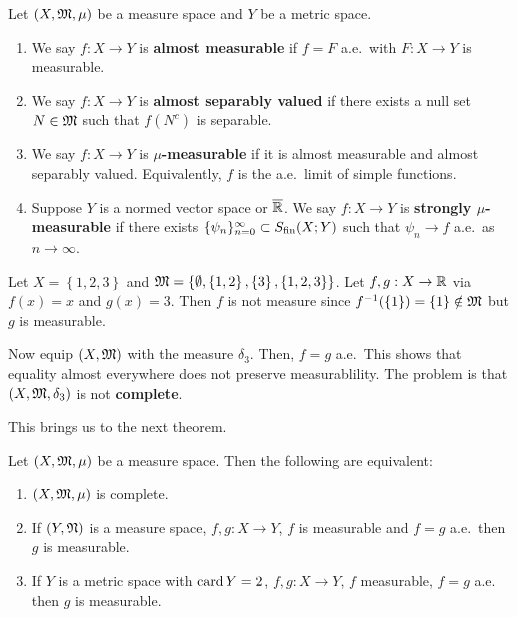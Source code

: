 \documentclass[a4paper]{article}
\renewcommand{\seqinfn}[1]{\{ #1 \}_{n=0}^\infty}
\begin{document}
\begin{defi}
  Let $(X, \mathfrak{M}, \mu)$ be a measure space and $Y$ be a metric space.
  \begin{enumerate}
    \item We say $f : X \to Y$ is \textbf{almost measurable} if $f = F$
          a.e.\ with $F: X \to Y$ is measurable.

    \item We say $f : X \to Y$ is \textbf{almost separably valued} if
          there exists a null set $N \in \mathfrak{M}$ such that $f(N^c)$ is
          separable.

    \item We say $f: X \to Y$ is \textbf{$\mu$-measurable} if it is almost
          measurable and almost separably valued. Equivalently, $f$ is the
          a.e.\ limit of simple functions.

    \item Suppose $Y$ is a normed vector space or $\overline{\mathbb{R}}$. We say $f: X
          \to Y$ is \textbf{strongly $\mu$-measurable} if there exists
          $\seqinfn{\psi_n} \subset \Sfin(X; Y)$ such that $\psi_n \to f$
          a.e.\ as $n \to \infty$.
  \end{enumerate}
\end{defi}

\begin{eg}
  Let $X = \left\{ 1,2,3 \right\}$ and $\mathfrak{M} = \left\{ \emptyset, \left\{
    1, 2 \right\}, \left\{ 3 \right\}, \left\{ 1, 2, 3 \right\} \right\}$.
  Let $f, g: X \to \mathbb{R}$ via $f(x) = x$ and $g(x) = 3$. Then $f$ is not
  measure since $f^{-1} (\left\{ 1 \right\}) = \left\{ 1 \right\} \notin
    \mathfrak{M}$ but $g$ is measurable.

  Now equip $(X, \mathfrak{M})$ with the measure $\delta_3$. Then, $f = g$ a.e.\
  This shows that equality almost everywhere does not preserve
  measurablility. The problem is that $(X, \mathfrak{M}, \delta_3)$ is not
  \textbf{complete}.
\end{eg}

This brings us to the next theorem.

\begin{thm}
  Let $(X, \mathfrak{M}, \mu)$ be a measure space. Then the following are
  equivalent:
  \begin{enumerate}
    \item $(X, \mathfrak{M}, \mu)$ is complete.
    \item If $(Y, \mathfrak{N})$ is a measure space, $f, g : X \to Y$, $f$ is
          measurable and $f = g$ a.e.\, then $g$ is measurable.
    \item If $Y$ is a metric space with $\operatorname{card} Y = 2$, $f, g: X \to Y$,
          $f$ measurable, $f = g$ a.e.\, then $g$ is measurable.
  \end{enumerate}
\end{thm}
\end{document}
